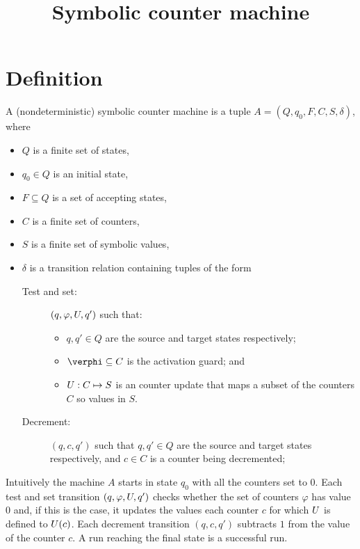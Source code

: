 \documentclass{article}
\begin{document}
\title{Symbolic counter machine}

\author{}
\maketitle

\section{Definition}

\begin{definition}
A (nondeterministic) symbolic counter machine is a tuple $A=(Q,q_0,F,C,S,\delta)$, 
where
\begin{itemize}
\item $Q$ is a finite set of states,
\item $q_0\in Q$ is an initial state,
\item $F\subseteq Q$ is a set of accepting states,
\item $C$ is a finite set of counters,
\item $S$ is a finite set of symbolic values,
\item $\delta$ is a transition relation containing tuples of the form
\begin{description}
\item[Test and set:] $(q,\varphi,U,q')$ such that:
\begin{itemize}
\item $q,q'\in Q$ are the source and target states respectively;
\item $\verphi\subseteq C$ is the activation guard; and
\item $U: C \mapsto S$ is an counter update that maps a subset of the counters $C$ so values in $S$.
\end{itemize}

\item[Decrement:] $(q,c,q')$ such that $q,q'\in Q$ are the source and target states respectively, and $c\in C$ is a counter being decremented;
    
\end{description}
\end{itemize}
\end{definition}


Intuitively the machine $A$ starts in state $q_0$ with all the counters set to $0$. 
Each test and set transition $(q,\varphi,U,q')$ checks whether the set of counters
$\varphi$ has value $0$ and, if this is the case, it updates the values each
counter $c$ for which $U$ is defined to $U(c)$.
Each decrement transition $(q,c,q')$ subtracts $1$ from the value of the counter $c$.
A run reaching the final state is a successful run.
\end{document}
